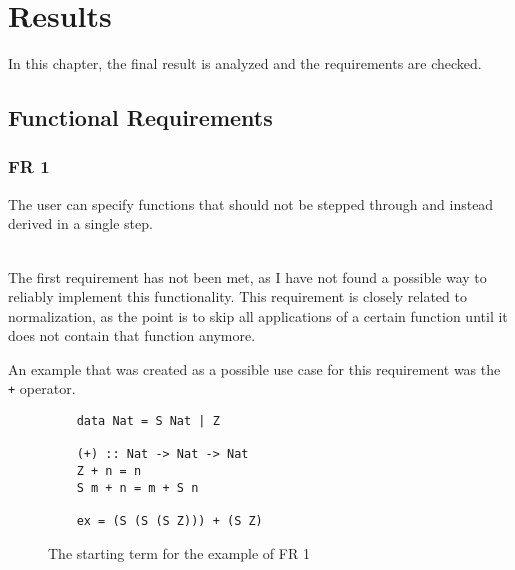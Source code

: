 \chapter{Results}

In this chapter,
the final result is analyzed and the requirements are checked.


\section{Functional Requirements}

\subsection{FR 1}
The user can specify functions that should not be stepped through and instead derived in a single step.

\ \\
The first requirement has not been met,
as I have not found a possible way to reliably implement this functionality.
This requirement is closely related to normalization,
as the point is to skip all applications of a certain function until it does not contain that function anymore.

An example that was created as a possible use case for this requirement was the \texttt{+} operator.

\begin{figure}[!ht]
\begin{verbatim}
    data Nat = S Nat | Z

    (+) :: Nat -> Nat -> Nat
    Z + n = n
    S m + n = m + S n

    ex = (S (S (S Z))) + (S Z)
\end{verbatim}
    \caption{The starting term for the example of FR 1}
    \label{fig:FR1example}
\end{figure}

